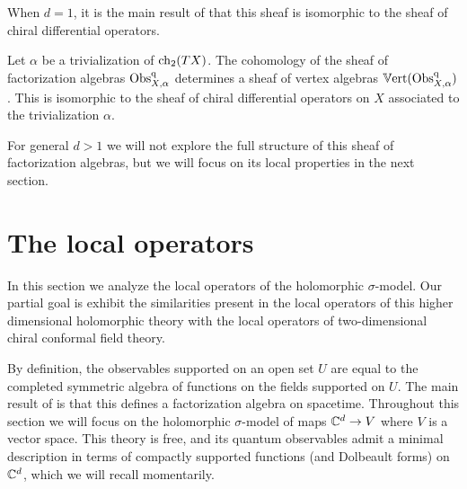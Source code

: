 When $d = 1$, it is the main result of \cite{GGW} that this sheaf is isomorphic to the sheaf of chiral differential operators.

\begin{thm} 
Let $\alpha$ be a trivialization of ${\rm ch}_{2}(TX)$.
The cohomology of the sheaf of factorization algebras ${\rm Obs}_{X,\alpha}^{\rm q}$ determines a sheaf of vertex algebras $\mathbb{V}{\rm ert}({\rm Obs}^{\rm q}_{X,\alpha})$.
This is isomorphic to the sheaf of chiral differential operators on $X$ associated to the trivialization $\alpha$.
\end{thm}
 
For general $d > 1$ we will not explore the full structure of this sheaf of factorization algebras, but we will focus on its local properties in the next section. 

\section{The local operators} \label{sec: local obs}

In this section we analyze the local operators of the holomorphic $\sigma$-model. 
Our partial goal is exhibit the similarities present in the local operators of this higher dimensional holomorphic theory with the local operators of two-dimensional chiral conformal field theory.

By definition, the observables supported on an open set $U$ are equal to the completed symmetric algebra of functions on the fields supported on $U$. 
The main result of \cite{CG2} is that this defines a factorization algebra on spacetime. 
Throughout this section we will focus on the holomorphic $\sigma$-model of maps $\mathbb C^d \to V$ where $V$ is a vector space.
This theory is free, and its quantum observables admit a minimal description in terms of compactly supported functions (and Dolbeault forms) on $\mathbb C^d$, which we will recall momentarily.

